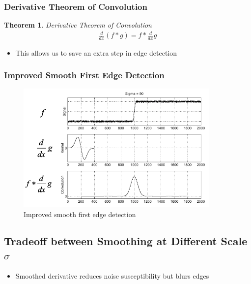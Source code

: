 \documentclass[letterpaper,12pt]{article}
\newtheorem{thm}{Theorem}
\begin{document}
\subsubsection{Derivative Theorem of Convolution}
\begin{thm}{Derivative Theorem of Convolution}
 \begin{align}
  \frac{d}{dx} (f*g) = f*\frac{d}{dx} g
 \end{align}
\end{thm}
\begin{itemize}
 \item This allows us to save an extra step in edge detection
\end{itemize}

\subsubsection{Improved Smooth First Edge Detection}
\begin{figure}[H]
 \centering
 \includegraphics[width=10cm]{images/smooth_first_efficient.png}
 \caption{Improved smooth first edge detection}
\end{figure}

\subsection{Tradeoff between Smoothing at Different Scale $\sigma$}
\begin{itemize}
 \item Smoothed derivative reduces noise susceptibility but blurs edges
\end{itemize}
\end{document}
